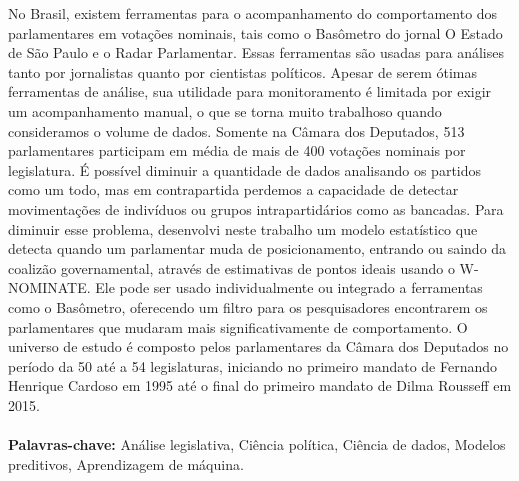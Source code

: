 No Brasil, existem ferramentas para o acompanhamento do comportamento dos
parlamentares em votações nominais, tais como o Basômetro do jornal O Estado de
São Paulo e o Radar Parlamentar. Essas ferramentas são usadas para análises
tanto por jornalistas quanto por cientistas políticos.
Apesar de serem ótimas ferramentas de análise, sua utilidade para monitoramento
é limitada por exigir um acompanhamento manual, o que se torna muito trabalhoso
quando consideramos o volume de dados. Somente na Câmara dos Deputados, 513
parlamentares participam em média de mais de 400 votações nominais por
legislatura. É possível diminuir a quantidade de dados analisando os partidos
como um todo, mas em contrapartida perdemos a capacidade de detectar
movimentações de indivíduos ou grupos intrapartidários como as bancadas.
Para diminuir esse problema, desenvolvi neste trabalho um modelo estatístico
que detecta quando um parlamentar muda de posicionamento, entrando ou saindo da
coalizão governamental, através de estimativas de pontos ideais usando o
W-NOMINATE. Ele pode ser usado individualmente ou integrado a ferramentas como
o Basômetro, oferecendo um filtro para os pesquisadores encontrarem os
parlamentares que mudaram mais significativamente de comportamento.
O universo de estudo é composto pelos parlamentares da Câmara dos Deputados no
período da 50\textordfeminine{} até a 54\textordfeminine{} legislaturas,
iniciando no primeiro mandato de Fernando Henrique Cardoso em 1995 até o final
do primeiro mandato de Dilma Rousseff em 2015.
\\
\\
\textbf{Palavras-chave:} Análise legislativa, Ciência política, Ciência de
dados, Modelos preditivos, Aprendizagem de máquina.

